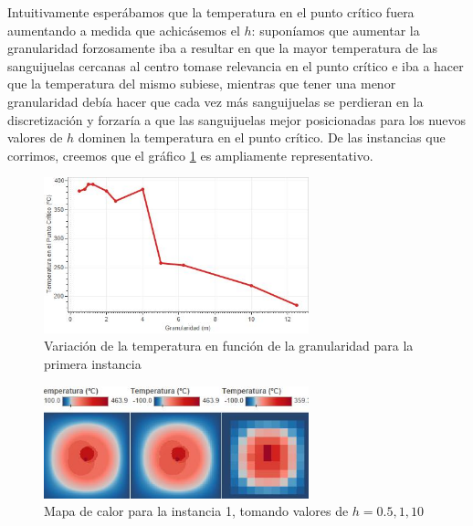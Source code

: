 Intuitivamente esperábamos que la temperatura en el punto crítico fuera aumentando a medida que achicásemos el $h$: suponíamos que aumentar la granularidad forzosamente iba a resultar en que la mayor temperatura de las sanguijuelas cercanas al centro tomase relevancia en el punto crítico e iba a hacer que la temperatura del mismo subiese, mientras que tener una menor granularidad debía hacer que cada vez más sanguijuelas se perdieran en la discretización y forzaría a que las sanguijuelas mejor posicionadas para los nuevos valores de $h$ dominen la temperatura en el punto crítico. De las instancias que corrimos, creemos que el gráfico \ref{fig:exp11} es ampliamente representativo.

\begin{figure}[h]
    \centering
    \includegraphics[width=0.685\textwidth]{experimento 1-1}
    \caption{Variación de la temperatura en función de la granularidad para la primera instancia}
    \label{fig:exp11}
\end{figure}

\begin{figure}[h]
    \centering
    \includegraphics[width=0.685\textwidth]{Ejemplo Instancia 1}
    \caption{Mapa de calor para la instancia 1, tomando valores de $h = 0.5, 1, 10$}
    \label{fig:exp11-vis}
\end{figure}

